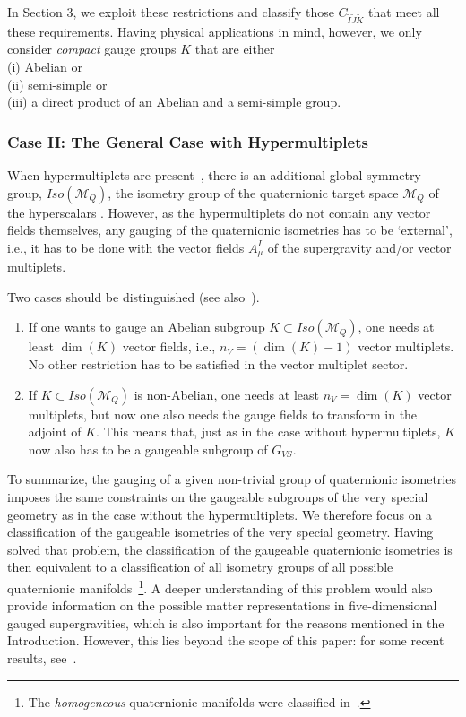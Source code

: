 \documentclass[a4paper,11pt]{article}
\newcommand{\ti}{\ensuremath{\tilde{I}}}
\newcommand{\tj}{\ensuremath{\tilde{J}}}
\newcommand{\tk}{\ensuremath{\tilde{K}}}
\newcommand{\M}{\ensuremath{\mathcal{M}}}
\begin{document}
In Section 3, we exploit these restrictions and
classify those $C_{\ti\tj\tk}$ that meet all these requirements.
Having physical applications in mind, however, we only
consider \emph{compact} gauge groups $K$ that are either \\
(i) Abelian or\\
(ii) semi-simple or \\
(iii) a direct product of an Abelian and a semi-simple group.

\subsubsection{Case II: The General Case with Hypermultiplets}

When hypermultiplets are present~\cite{CD,Sier}, there is an additional
 global symmetry 
group, $Iso(\M_{Q})$, the isometry group of the quaternionic target 
space $\M_{Q}$ of 
the hyperscalars \cite{bagwit}.  However, as the hypermultiplets do not 
contain any 
vector fields themselves, any gauging of the quaternionic isometries has 
to be 
`external', i.e., it has to be done  with the vector fields $A^{I}_{\mu}$ 
of the 
supergravity and/or vector multiplets.

Two cases should be distinguished (see also~\cite{CD,LOSW2,ABCDFF}).

\begin{enumerate}
\item If one wants to gauge an Abelian subgroup $K\subset Iso(\M_{Q})$,
one needs at least $\dim(K)$ vector fields, i.e.,
$n_{V}=(\dim(K)-1)$ vector multiplets. No other restriction has to
be satisfied in the vector multiplet sector.
\item
If $K\subset Iso(\M_{Q})$ is non-Abelian, one needs at 
least $n_{V}=\dim(K) $ vector 
multiplets, but now one also needs the gauge fields to 
transform in the adjoint of $K$. 
This  means that, just as in the case without hypermultiplets, $K$ now also has to be a 
gaugeable subgroup of $G_{VS}$.
\end{enumerate}

To summarize, the gauging of a given non-trivial group of quaternionic
isometries imposes the same constraints on the gaugeable subgroups of the
very special geometry as in the case without the hypermultiplets. We
therefore focus on a classification of the gaugeable isometries of the
very special geometry. Having solved that problem, the classification of
the gaugeable quaternionic isometries is then equivalent to a
classification of all isometry groups of all possible quaternionic
manifolds~\footnote{The \emph{homogeneous} quaternionic manifolds were
classified in~\cite{dWvP2}.}. A deeper understanding of this problem would
also provide information on the possible matter representations in
five-dimensional gauged supergravities, which is also important for the
reasons mentioned in the Introduction. However, this lies beyond the scope
of this paper: for some recent results, see~\cite{dWRV}. 
\end{document}
